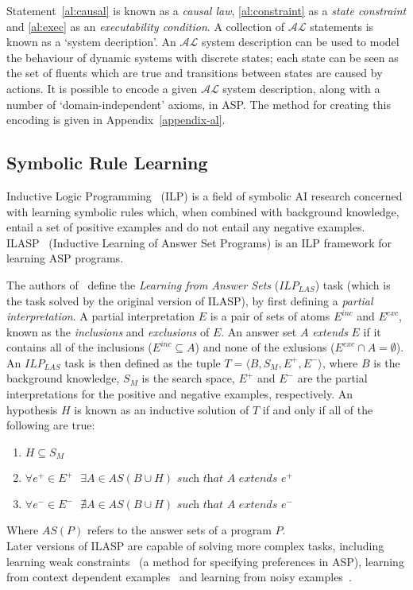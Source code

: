 \documentclass[../interim.tex]{subfiles}
\begin{document}
Statement~\ref{al:causal} is known as a \textit{causal law}, \ref{al:constraint} as a \textit{state constraint} and \ref{al:exec} as an \textit{executability condition}. A collection of $\mathcal{AL}$ statements is known as a `system decription'. An $\mathcal{AL}$ system description can be used to model the behaviour of dynamic systems with discrete states; each state can be seen as the set of fluents which are true and transitions between states are caused by actions. It is possible to encode a given $\mathcal{AL}$ system description, along with a number of `domain-independent' axioms, in ASP. The method for creating this encoding is given in Appendix~\ref{appendix-al}.

\subsection{Symbolic Rule Learning}

Inductive Logic Programming~\cite{ilp-intro} (ILP) is a field of symbolic AI research concerned with learning symbolic rules which, when combined with background knowledge, entail a set of positive examples and do not entail any negative examples. ILASP~\cite{ilasp-system} (Inductive Learning of Answer Set Programs) is an ILP framework for learning ASP programs.

The authors of~\cite{ilasp-1} define the \textit{Learning from Answer Sets} ($ILP_{LAS}$) task (which is the task solved by the original version of ILASP), by first defining a \textit{partial interpretation}. A partial interpretation $E$ is a pair of sets of atoms $E^{inc}$ and $E^{exc}$, known as the \textit{inclusions} and \textit{exclusions} of $E$. An answer set $A$ \textit{extends} $E$ if it contains all of the inclusions ($E^{inc} \subseteq A$) and none of the exlusions ($E^{exc} \cap A = \emptyset$). An $ILP_{LAS}$ task is then defined as the tuple $T = \langle B, S_M, E^+, E^- \rangle$, where $B$ is the background knowledge, $S_M$ is the search space, $E^+$ and $E^-$ are the partial interpretations for the positive and negative examples, respectively. An hypothesis $H$ is known as an inductive solution of $T$ if and only if all of the following are true:
\begin{enumerate}
  \item $H \subseteq S_M$
  \item $\forall e^+ \in E^+ \text{ } \exists A \in AS(B \cup H) \textit{ such that } A \textit{ extends } e^+$
  \item $\forall e^- \in E^- \text{ } \nexists A \in AS(B \cup H) \textit{ such that } A \textit{ extends } e^-$
\end{enumerate}
\noindent
{\footnotesize Where $AS(P)$ refers to the answer sets of a program $P$.} \\

Later versions of ILASP are capable of solving more complex tasks, including learning weak constraints~\cite{ilasp-wc} (a method for specifying preferences in ASP), learning from context dependent examples~\cite{ilasp-cde} and learning from noisy examples~\cite{ilasp-noisy}.
\end{document}
